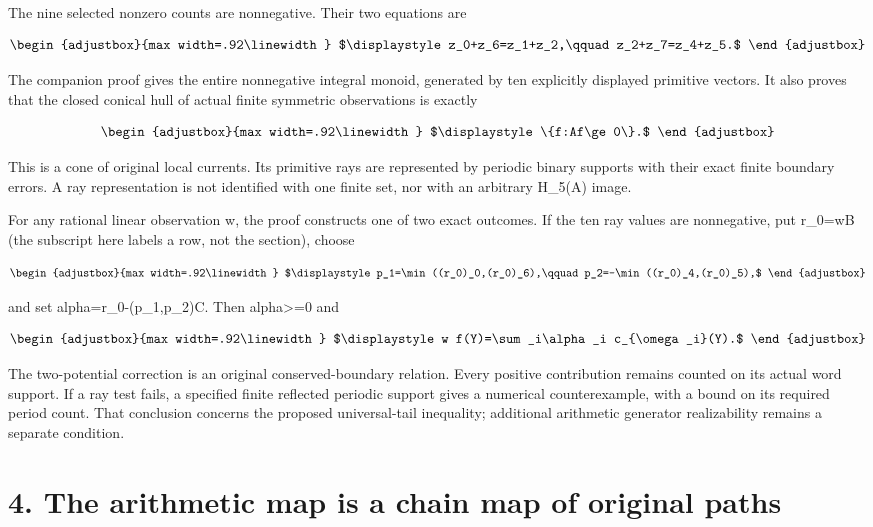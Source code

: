 The nine selected nonzero counts are nonnegative. Their two equations are

\[
\begin{adjustbox}{max width=.92\linewidth}
$\displaystyle z_0+z_6=z_1+z_2,\qquad z_2+z_7=z_4+z_5.$
\end{adjustbox}
\]

The companion proof gives the entire nonnegative integral monoid, generated by ten explicitly displayed primitive vectors. It also proves that the closed conical hull of actual finite symmetric observations is exactly

\[
\begin{adjustbox}{max width=.92\linewidth}
$\displaystyle \{f:Af\ge0\}.$
\end{adjustbox}
\]

This is a cone of original local currents. Its primitive rays are represented by periodic binary supports with their exact finite boundary errors. A ray representation is not identified with one finite set, nor with an arbitrary H\_5(A) image.

For any rational linear observation w, the proof constructs one of two exact outcomes. If the ten ray values are nonnegative, put r\_0=wB (the subscript here labels a row, not the section), choose

\[
\begin{adjustbox}{max width=.92\linewidth}
$\displaystyle p_1=\min((r_0)_0,(r_0)_6),\qquad
p_2=-\min((r_0)_4,(r_0)_5),$
\end{adjustbox}
\]

and set alpha=r\_0-(p\_1,p\_2)C. Then alpha\textgreater=0 and

\[
\begin{adjustbox}{max width=.92\linewidth}
$\displaystyle w f(Y)=\sum_i\alpha_i c_{\omega_i}(Y).$
\end{adjustbox}
\]

The two-potential correction is an original conserved-boundary relation. Every positive contribution remains counted on its actual word support. If a ray test fails, a specified finite reflected periodic support gives a numerical counterexample, with a bound on its required period count. That conclusion concerns the proposed universal-tail inequality; additional arithmetic generator realizability remains a separate condition.

\section{4. The arithmetic map is a chain map of original paths}\label{n27-the-arithmetic-map-is-a-chain-map-of-original-paths}

